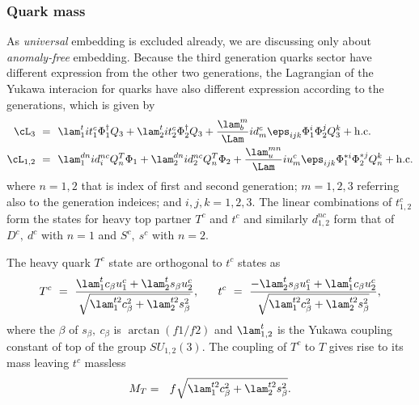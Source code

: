 \subsubsection*{Quark mass}

As \emph{universal} embedding is excluded already, we are discussing only about \emph{anomaly-free} embedding.
Because the third generation quarks sector have different expression from the other two generations,
the Lagrangian of the Yukawa interacion for quarks have also different expression according to the generations,
which is given by
\begin{align}
 \cL_3 ~=&~~ \lam_1^t it_1^c \Phi_1^\dagger Q_3 + \lam_2^t it_2^c \Phi_2^\dagger Q_3 
 + \frac{\lam_b^m}{\Lam} id_m^c \eps_{ijk}\Phi_1^i \Phi_2^j Q_3^k + {\rm{h.c.}} \nonumber \\
 \cL_{1,2}~ =&~~ \lam_1^{dn} id_i^{nc} Q_n^T \Phi_1 + \lam_2^{dn} id_2^{nc} Q_n^T \Phi_2 
 + \frac{\lam_u^{mn}}{\Lam} iu_m^c \eps_{ijk} \Phi_1^{*i} \Phi_2^{*j} Q_n^k + {\rm{h.c.}}
 \end{align}
where $n= 1,2$ that is index of first and second generation; $m=1,2,3$ referring also to the generation indeices; and $i,j,k=1,2,3$. %
The linear combinations of $t_{1,2}^c$ form the states for heavy top partner $T^c$ and $t^c$ and similarly 
$d_{1,2}^{nc}$ form that of $D^c,~d^c$ with $n=1$ and $S^c,~s^c$ with $n=2$.

The heavy quark $T^c$ state are orthogonal to $t^c$ states as 
\begin{align}
 T^c~=~\frac{\lam_1^t c_\beta u_1^c + \lam_2^t s_\beta u_2^c}{\sqrt{\lam_1^{t2} c_\beta^2 + \lam_2^{t2} s_\beta^2}}, ~~~~~ 
 t^c~=~\frac{-\lam_2^t s_\beta u_1^c + \lam_1^t c_\beta u_2^c}{\sqrt{\lam_1^{t2} c_\beta^2 + \lam_2^{t2} s_\beta^2}},
\end{align}
where the $\beta$ of $s_\beta,~c_\beta$ is $\arctan(f1/f2)$ and $\lam_{1,2}^t$ is the Yukawa coupling constant of top of the group $SU_{1,2}(3)$.
The coupling of $T^c$ to $T$ gives rise to its mass leaving $t^c$ massless
\begin{align}
 M_T = ~~f \sqrt{\lam_1^{t2} c_\beta^2 + \lam_2^{t2} s_\beta^2}.
\end{align}

